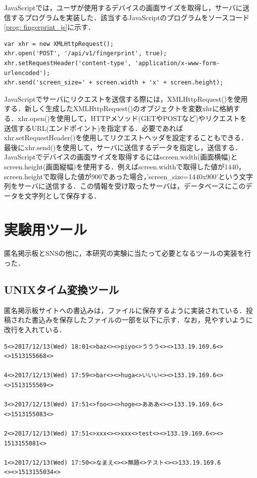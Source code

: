 \documentclass[10pt, a4paper]{jreport}
\begin{document}
JavaScriptでは，ユーザが使用するデバイスの画面サイズを取得し，サーバに送信するプログラムを実装した．該当するJavaScriptのプログラムをソースコード\ref{prog: fingerprint_js}に示す．

\begin{lstlisting}[caption=画面サイズの取得とサーバへの送信,label=prog: fingerprint_js]
var xhr = new XMLHttpRequest();
xhr.open('POST', '/api/v1/fingerprint', true);
xhr.setRequestHeader('content-type', 'application/x-www-form-urlencoded');
xhr.send('screen_size=' + screen.width + 'x' + screen.height);
\end{lstlisting}

JavaScriptでサーバにリクエストを送信する際には，XMLHttpRequest()を使用する．新しく生成したXMLHttpRequest()のオブジェクトを変数xhrに格納する．xhr.open()を使用して，HTTPメソッド(GETやPOSTなど)やリクエストを送信するURL(エンドポイント)を指定する．必要であればxhr.setRequestHeader()を使用してリクエストヘッダを設定することもできる．最後にxhr.send()を使用して，サーバに送信するデータを指定し，送信する．JavaScriptでデバイスの画面サイズを取得するにはscreen.width(画面横幅)とscreen.height(画面縦幅)を使用する．例えばscreen.widthで取得した値が1440，screen.heightで取得した値が900であった場合，'screen\_size=1440x900'という文字列をサーバに送信する．この情報を受け取ったサーバは，データベースにこのデータを文字列として保存する．

\section{実験用ツール}
匿名掲示板とSNSの他に，本研究の実験に当たって必要となるツールの実装を行った．

\subsection{UNIXタイム変換ツール}\label{sec: unix_time_translation}
匿名掲示板サイトへの書込みは，ファイルに保存するように実装されている．投稿された書込みを保存したファイルの一部を以下に示す．なお，見やすいように改行を入れている．

\begin{verbatim}
5<>2017/12/13(Wed) 18:01<>baz<><>piyo<>ううう<><>133.19.169.6<>
<>1513155668<>

4<>2017/12/13(Wed) 17:59<>bar<><>huga<>いいい<><>133.19.169.6<>
<>1513155569<>

3<>2017/12/13(Wed) 17:51<>foo<><>hoge<>あああ<><>133.19.169.6<>
<>1513155083<>

2<>2017/12/13(Wed) 17:51<>xxx<><>xxx<>test<><>133.19.169.6<><>
1513155081<>

1<>2017/12/13(Wed) 17:50<>なまえ<><>無題<>テスト<><>133.19.169.6
<><>1513155034<>
\end{verbatim}
\end{document}
